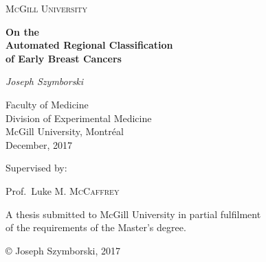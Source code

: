 \begin{titlepage}
	\centering
	\vspace{1cm}
	{\scshape\Large McGill University\par}
	\vspace{1.5cm}
	{\huge\bfseries On the\\Automated Regional Classification\\of Early Breast Cancers\par}
	\vspace{2cm}
	{\Large\itshape Joseph Szymborski\par}
	\vspace{1cm}
	{\large Faculty of Medicine\\
		Division of Experimental Medicine\\
		McGill University, Montréal\\
		December, 2017\par}
	\vspace{1.5cm}
	Supervised by:\par
	Prof.~Luke M. \textsc{McCaffrey}
	
	\vfill
	{A thesis submitted to McGill University in partial fulfilment\\of the requirements of the Master's degree.\par}
	\vfill

	{© Joseph Szymborski, 2017\par}
\end{titlepage}
